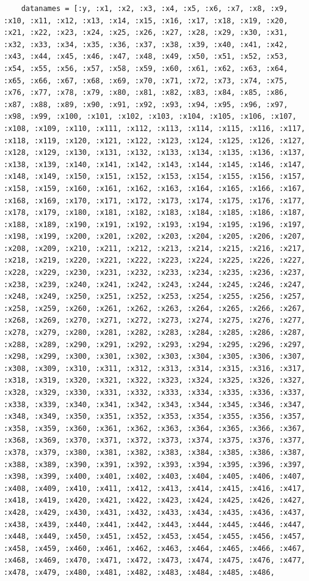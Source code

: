 \documentclass{article}
\begin{document}
\begin{lstlisting}
    datanames = [:y, :x1, :x2, :x3, :x4, :x5, :x6, :x7, :x8, :x9, :x10, :x11, :x12, :x13, :x14, :x15, :x16, :x17, :x18, :x19, :x20, :x21, :x22, :x23, :x24, :x25, :x26, :x27, :x28, :x29, :x30, :x31, :x32, :x33, :x34, :x35, :x36, :x37, :x38, :x39, :x40, :x41, :x42, :x43, :x44, :x45, :x46, :x47, :x48, :x49, :x50, :x51, :x52, :x53, :x54, :x55, :x56, :x57, :x58, :x59, :x60, :x61, :x62, :x63, :x64, :x65, :x66, :x67, :x68, :x69, :x70, :x71, :x72, :x73, :x74, :x75, :x76, :x77, :x78, :x79, :x80, :x81, :x82, :x83, :x84, :x85, :x86, :x87, :x88, :x89, :x90, :x91, :x92, :x93, :x94, :x95, :x96, :x97, :x98, :x99, :x100, :x101, :x102, :x103, :x104, :x105, :x106, :x107, :x108, :x109, :x110, :x111, :x112, :x113, :x114, :x115, :x116, :x117, :x118, :x119, :x120, :x121, :x122, :x123, :x124, :x125, :x126, :x127, :x128, :x129, :x130, :x131, :x132, :x133, :x134, :x135, :x136, :x137, :x138, :x139, :x140, :x141, :x142, :x143, :x144, :x145, :x146, :x147, :x148, :x149, :x150, :x151, :x152, :x153, :x154, :x155, :x156, :x157, :x158, :x159, :x160, :x161, :x162, :x163, :x164, :x165, :x166, :x167, :x168, :x169, :x170, :x171, :x172, :x173, :x174, :x175, :x176, :x177, :x178, :x179, :x180, :x181, :x182, :x183, :x184, :x185, :x186, :x187, :x188, :x189, :x190, :x191, :x192, :x193, :x194, :x195, :x196, :x197, :x198, :x199, :x200, :x201, :x202, :x203, :x204, :x205, :x206, :x207, :x208, :x209, :x210, :x211, :x212, :x213, :x214, :x215, :x216, :x217, :x218, :x219, :x220, :x221, :x222, :x223, :x224, :x225, :x226, :x227, :x228, :x229, :x230, :x231, :x232, :x233, :x234, :x235, :x236, :x237, :x238, :x239, :x240, :x241, :x242, :x243, :x244, :x245, :x246, :x247, :x248, :x249, :x250, :x251, :x252, :x253, :x254, :x255, :x256, :x257, :x258, :x259, :x260, :x261, :x262, :x263, :x264, :x265, :x266, :x267, :x268, :x269, :x270, :x271, :x272, :x273, :x274, :x275, :x276, :x277, :x278, :x279, :x280, :x281, :x282, :x283, :x284, :x285, :x286, :x287, :x288, :x289, :x290, :x291, :x292, :x293, :x294, :x295, :x296, :x297, :x298, :x299, :x300, :x301, :x302, :x303, :x304, :x305, :x306, :x307, :x308, :x309, :x310, :x311, :x312, :x313, :x314, :x315, :x316, :x317, :x318, :x319, :x320, :x321, :x322, :x323, :x324, :x325, :x326, :x327, :x328, :x329, :x330, :x331, :x332, :x333, :x334, :x335, :x336, :x337, :x338, :x339, :x340, :x341, :x342, :x343, :x344, :x345, :x346, :x347, :x348, :x349, :x350, :x351, :x352, :x353, :x354, :x355, :x356, :x357, :x358, :x359, :x360, :x361, :x362, :x363, :x364, :x365, :x366, :x367, :x368, :x369, :x370, :x371, :x372, :x373, :x374, :x375, :x376, :x377, :x378, :x379, :x380, :x381, :x382, :x383, :x384, :x385, :x386, :x387, :x388, :x389, :x390, :x391, :x392, :x393, :x394, :x395, :x396, :x397, :x398, :x399, :x400, :x401, :x402, :x403, :x404, :x405, :x406, :x407, :x408, :x409, :x410, :x411, :x412, :x413, :x414, :x415, :x416, :x417, :x418, :x419, :x420, :x421, :x422, :x423, :x424, :x425, :x426, :x427, :x428, :x429, :x430, :x431, :x432, :x433, :x434, :x435, :x436, :x437, :x438, :x439, :x440, :x441, :x442, :x443, :x444, :x445, :x446, :x447, :x448, :x449, :x450, :x451, :x452, :x453, :x454, :x455, :x456, :x457, :x458, :x459, :x460, :x461, :x462, :x463, :x464, :x465, :x466, :x467, :x468, :x469, :x470, :x471, :x472, :x473, :x474, :x475, :x476, :x477, :x478, :x479, :x480, :x481, :x482, :x483, :x484, :x485, :x486, 
\end{lstlisting}
\end{document}
